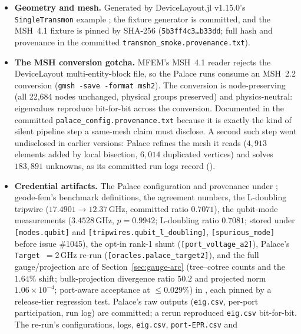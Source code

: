 \documentclass{anvil-paper}
\begin{document}
\begin{itemize}
  \item \textbf{Geometry and mesh.} Generated by DeviceLayout.jl
    v1.15.0's \texttt{SingleTransmon} example \citep{devicelayout}; the
    fixture generator is committed, and the MSH~4.1 fixture is pinned by
    SHA-256 (\texttt{5b3ff4c3\ldots{}b33dd}; full hash and provenance in
    the committed \texttt{transmon\_smoke.provenance.txt}).
  \item \textbf{The MSH conversion gotcha.} MFEM's MSH~4.1 reader
    rejects the DeviceLayout multi-entity-block file, so the Palace runs
    consume an MSH~2.2 conversion (\texttt{gmsh -save -format msh2}).
    The conversion is node-preserving (all 22{,}684 nodes unchanged,
    physical groups preserved) and physics-neutral: eigenvalues
    reproduce bit-for-bit across the conversion. Documented in the
    committed \texttt{palace\_config.provenance.txt} because it is
    exactly the kind of silent pipeline step a same-mesh claim must
    disclose. A second such step went undisclosed in earlier versions:
    Palace refines the mesh it reads ($4{,}913$ elements added by local
    bisection, $6{,}014$ duplicated vertices) and solves $183{,}891$
    unknowns, as its committed run logs record
    ().
  \item \textbf{Credential artifacts.} The Palace configuration and
    provenance under ;
    geode-fem's benchmark definitions, the agreement numbers, the
    L-doubling tripwire ($17.4901 \to 12.37$\,GHz, committed ratio
    $0.7071$), the qubit-mode measurements ($3.4528$\,GHz,
    $p = 0.9942$; L-doubling ratio $0.7081$; stored under
    \texttt{[modes.qubit]} and \texttt{[tripwires.qubit\_l\_doubling]},
    \texttt{[spurious\_mode]} before issue \#1045), the opt-in rank-1
    shunt (\texttt{[port\_voltage\_a2]}), Palace's
    \texttt{Target}~$= 2$\,GHz re-run
    (\texttt{[oracles.palace\_target2]}), and the full
    gauge/projection arc of Section~\ref{sec:gauge-arc}
    (tree--cotree counts and the $1.64\%$ shift; bulk-projection
    divergence ratio $50.2$ and projected norm $1.06\times10^{-4}$;
    port-aware acceptance at $\leq 0.029\%$) in
    , each pinned by a
    release-tier regression test. Palace's raw outputs
    (\texttt{eig.csv}, per-port participation, run log) are committed;
    a rerun reproduced \texttt{eig.csv} bit-for-bit. The re-run's
    configurations, logs, \texttt{eig.csv}, \texttt{port-EPR.csv} and

\end{itemize}
\end{document}
